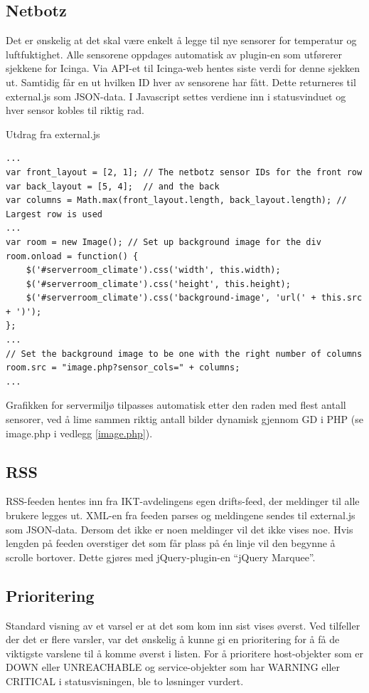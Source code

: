 \subsection{Netbotz}
Det er ønskelig at det skal være enkelt å legge til nye sensorer for temperatur og luftfuktighet. Alle sensorene oppdages automatisk av plugin-en som utførerer sjekkene for Icinga. Via API-et til Icinga-web hentes siste verdi for denne sjekken ut. Samtidig får en ut hvilken ID hver av sensorene har fått. Dette returneres til external.js som JSON-data. I Javascript settes verdiene inn i statusvinduet og hver sensor kobles til riktig rad.

Utdrag fra external.js
\begin{lstlisting}
...
var front_layout = [2, 1]; // The netbotz sensor IDs for the front row
var back_layout = [5, 4];  // and the back
var columns = Math.max(front_layout.length, back_layout.length); // Largest row is used 
...
var room = new Image(); // Set up background image for the div
room.onload = function() {
    $('#serverroom_climate').css('width', this.width);
    $('#serverroom_climate').css('height', this.height);
    $('#serverroom_climate').css('background-image', 'url(' + this.src + ')');
};
...
// Set the background image to be one with the right number of columns
room.src = "image.php?sensor_cols=" + columns;
...
\end{lstlisting}

Grafikken for servermiljø tilpasses automatisk etter den raden med flest antall sensorer, ved å lime sammen riktig antall bilder dynamisk gjennom GD i PHP (se image.php i vedlegg \ref{image.php}).

\subsection{RSS}
RSS-feeden hentes inn fra IKT-avdelingens egen drifts-feed, der meldinger til alle brukere legges ut. XML-en fra feeden parses og meldingene sendes til external.js som JSON-data. Dersom det ikke er noen meldinger vil det ikke vises noe. Hvis lengden på feeden overstiger det som får plass på én linje vil den begynne å scrolle bortover. Dette gjøres med jQuery-plugin-en ``jQuery Marquee''\cite{jqmarquee}.

\subsection{Prioritering}
Standard visning av et varsel er at det som kom inn sist vises øverst. Ved tilfeller der det er flere varsler, var det ønskelig å kunne gi en prioritering for å få de viktigste varslene til å komme øverst i listen. For å prioritere host-objekter som er DOWN eller UNREACHABLE og service-objekter som har WARNING eller CRITICAL i statusvisningen, ble to løsninger vurdert. 

